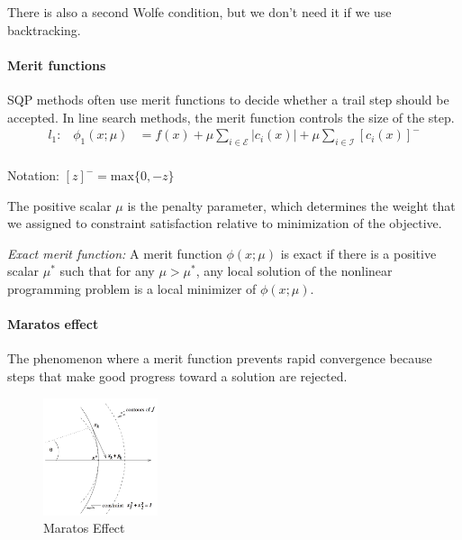 There is also a second Wolfe condition, but we don't need it if we use backtracking.

\paragraph{Merit functions} SQP methods often use merit functions to decide whether a trail step should be accepted. In line search methods, the merit function controls the size of the step.
\begin{equation}
    \begin{split}
        l_1\text{:} \quad \phi_1(x;\mu) &= f(x) + \mu \sum_{i \in \mathcal{E}} |c_i(x)| + \mu \sum_{i \in \mathcal{I}} [c_i(x)]^-\\
    \end{split}
\end{equation}

Notation: $[z]^- = \text{max}\{0, -z\}$

The positive scalar $\mu$ is the penalty parameter, which determines the weight that we assigned to constraint satisfaction relative to minimization of the objective.

\textit{Exact merit function:} A merit function $\phi(x; \mu)$ is exact if there is a positive scalar $\mu^*$ such that for any $\mu > \mu^*$, any local solution of the nonlinear programming problem is a local minimizer of $\phi(x; \mu)$.

\paragraph{Maratos effect} The phenomenon where a merit function prevents rapid convergence because steps that make good progress toward a solution are rejected.

\begin{figure}[H]
	\centering
	\includegraphics[width=0.3\textwidth]{images/maratos_effect}
	\caption{Maratos Effect}
	\label{fig:maratos_effect}
\end{figure}

